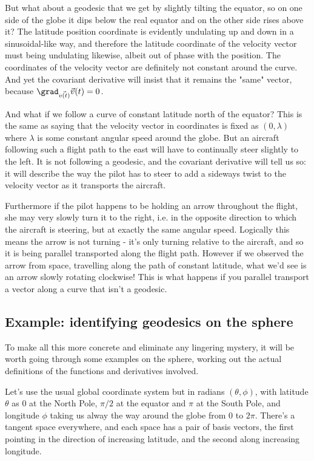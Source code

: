 But what about a geodesic that we get by slightly tilting the equator, so on one side of the globe it dips below the real equator and on the other side rises above it? The latitude position coordinate is evidently undulating up and down in a sinusoidal-like way, and therefore the latitude coordinate of the velocity vector must being undulating likewise, albeit out of phase with the position. The coordinates of the velocity vector are definitely not constant around the curve. And yet the covariant derivative will insist that it remains the "same" vector, because $\grad_{\vec{v(t)}} \vec{v}(t) = 0$.

And what if we follow a curve of constant latitude north of the equator? This is the same as saying that the velocity vector in coordinates is fixed as $(0, \lambda)$ where $\lambda$ is some constant angular speed around the globe. But an aircraft following such a flight path to the east will have to continually steer slightly to the left. It is not following a geodesic, and the covariant derivative will tell us so: it will describe the way the pilot has to steer to add a sideways twist to the velocity vector as it transports the aircraft.

Furthermore if the pilot happens to be holding an arrow throughout the flight, she may very slowly turn it to the right, i.e. in the opposite direction to which the aircraft is steering, but at exactly the same angular speed. Logically this means the arrow is not turning - it's only turning relative to the aircraft, and so it is being parallel transported along the flight path. However if we observed the arrow from space, travelling along the path of constant latitude, what we'd see is an arrow slowly rotating clockwise! This is what happens if you parallel transport a vector along a curve that isn't a geodesic.

\subsection{Example: identifying geodesics on the sphere}

To make all this more concrete and eliminate any lingering mystery, it will be worth going through some examples on the sphere, working out the actual definitions of the functions and derivatives involved.

Let's use the usual global coordinate system but in radians $(\theta, \phi)$, with latitude $\theta$ as $0$ at the North Pole, $\pi/2$ at the equator and $\pi$ at the South Pole, and longitude $\phi$ taking us alway the way around the globe from $0$ to $2\pi$. There's a tangent space everywhere, and each space has a pair of basis vectors, the first pointing in the direction of increasing latitude, and the second along increasing longitude.

